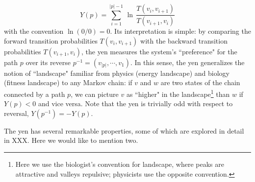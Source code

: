 \documentclass[aps,prd,11pt,notitlepage,nofootinbib,superscriptaddress,showkeys,letterpaper]{revtex4-1}
\begin{document}
\begin{equation}
        Y(p)=\sum_{i=1}^{\vert p \vert-1}\,\ln\,\frac{T(v_i,v_{i+1})}{T(v_{i+1},v_{i})}
\end{equation}
with the convention $\ln(0/0)=0$. Its interpretation is simple: by comparing the forward transition probabilities $T(v_i,v_{i+1})$ with the backward transition probabilities $T(v_{i+1},v_{i})$, the yen measures the system's ``preference" for the path $p$ over its reverse $p^{-1}=(v_{\vert p \vert},\cdots,v_1)$. In this sense, the yen generalizes the notion of ``landscape" familiar from physics (energy landscape) and biology (fitness landscape) to any Markov chain: if $v$ and $w$ are two states of the chain connected by a path $p$, we can picture $v$ as ``higher" in the landscape\footnote{Here we use the biologist's convention for landscape, where peaks are attractive and valleys repulsive; physicists use the opposite convention.} than $w$ if $Y(p)<0$ and vice versa. Note that the yen is trivially odd with respect to reversal, $Y(p^{-1})=-Y(p)$. 

The yen has several remarkable properties, some of which are explored in detail in XXX. Here we would like to mention two. 
\end{document}
